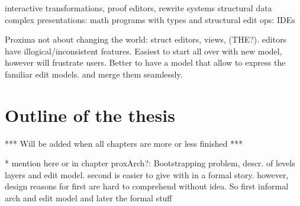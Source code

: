 interactive transformations, proof editors, rewrite systems
structural data complex presentations: math
programs with types and structural edit ops: IDEs

Proxima not about changing the world: struct editors, views, (THE?). editors have illogical/inconsistent features. Easiest to start all over with new model, however will frustrate users. Better to have a model that allow to express the familiar edit models. and merge them seamlessly.
\ec


\section{Outline of the thesis}

*** Will be added when all chapters are more or less finished ***

%
%
%
%
%

%

%
%
\bc
* mention here or in chapter proxArch?:
Bootstrapping problem, descr. of levels layers and edit model. second is easier to give with in a formal story. however, design reasons for first are hard to comprehend without idea. So first informal arch and edit model and later the formal stuff

